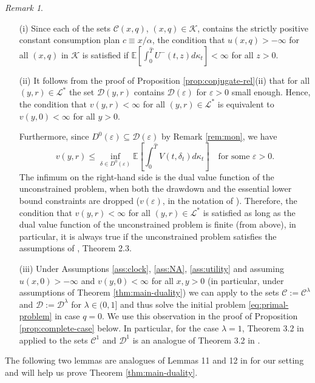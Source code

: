 \documentclass[11pt, oneside]{article}   	%
\theoremstyle{plain}
\theoremstyle{definition}
\theoremstyle{remark}
\newtheorem{rem}[thm]{Remark}
\begin{document}
\begin{rem}\label{rem:duality-thm}
\begin{enumerate}
\item[(i)]Since each of the sets $\mathcal{C}(x,q)$, $(x,q)\in\mathcal{K}$, contains the strictly positive constant consumption plan $c\equiv x/\alpha$, the condition that $u(x,q)>-\infty$ for all $(x,q)$ in $\mathcal{K}$ is satisfied if $\mathbb{E}\left[\int_0^{\hat{T}} U^-(t,z)d\kappa_t\right]<\infty$ for all $z>0$.
\item[(ii)] It follows from the proof of Proposition \ref{prop:conjugate-rel}(ii) that for all $(y,r)\in\mathcal{L}^*$ the set $\mathcal{D}(y,r)$ contains $\mathcal{D}(\varepsilon)$ for $\varepsilon>0$ small enough. Hence, the condition that $v(y,r)<\infty$ for all  $(y,r)\in\mathcal{L}^*$ is equivalent to $v(y,0)<\infty$ for all $y>0$.

Furthermore, since ${D}^0(\varepsilon)\subseteq\mathcal{D}(\varepsilon)$ by Remark \ref{rem:mon}, we have
$$v(y,r)\leq \inf_{\delta\in{D}^0(\varepsilon)}\mathbb{E}\left[\int_0^{\hat{T}} V(t,\delta_t)d\kappa_t\right]\quad \text{for some }\varepsilon>0.$$
The infimum on the right-hand side is the dual value function of the unconstrained problem, when both the drawdown and the essential lower bound constraints are dropped ($v(\varepsilon)$, in the notation of \cite{mostovyi}). Therefore, the condition that $v(y,r)<\infty$ for all $(y,r)\in\mathcal{L}^*$ is satisfied as long as the dual value function of the unconstrained problem is finite (from above), in particular, it is always true if the unconstrained problem satisfies the assumptions of \cite{mostovyi}, Theorem 2.3.
\item[(iii)]
Under Assumptions \ref{ass:clock}, \ref{ass:NA}, \ref{ass:utility} and assuming $u(x,0)>-\infty$ and $v(y,0)<\infty$ for all $x,y>0$ (in particular, under assumptions of Theorem \ref{thm:main-duality}) we can apply \cite[Theorem 3.2]{mostovyi} to the sets $\mathcal{C}:=\mathcal{C}^\lambda$ and $\mathcal{D}:=\mathcal{D}^\lambda$ for $\lambda\in(0,1]$ and thus solve the initial problem \eqref{eq:primal-problem} in case $q=0$. We use this observation in the proof of Proposition \ref{prop:complete-case} below. In particular, for the case $\lambda=1$, Theorem 3.2 in \cite{mostovyi} applied to the sets $\mathcal{C}^1$ and $\mathcal{D}^1$ is an analogue of Theorem 3.2 in \cite{BK}.
\end{enumerate}
\end{rem}
The following two lemmas are analogues of Lemmas 11 and 12 in \cite{hug-kramkov} for our setting and will help us prove Theorem \ref{thm:main-duality}.
\end{document}
